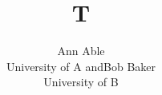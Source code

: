 \documentclass{article}
\renewcommand{\and}{{\normalfont and}}
\newcommand{\univ}{University}
\begin{document}
\title{T}
\author{Ann Able\\\univ{} of A \and Bob Baker\\\univ{} of B}
\maketitle
\end{document}
